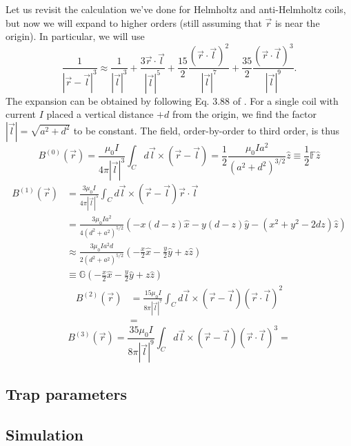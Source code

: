 \documentclass{article}
\theoremstyle{definition}
\newcommand{\f}[2]{\frac{#1}{#2}}
\begin{document}
Let us revisit the calculation we've done for Helmholtz and anti-Helmholtz coils, but now we will expand to higher orders (still assuming that $\vec{r}$ is near the origin). In particular, we will use
\begin{equation*}
\f{1}{|\vec{r} - \vec{l}|^3} \approx \f{1}{|\vec{l}|^3} + \f{3 \vec{r}\cdot \vec{l}}{|\vec{l}|^5} + \f{15}{2}\f{(\vec{r}\cdot\vec{l})^2}{|\vec{l}|^7} + \f{35}{2} \f{(\vec{r}\cdot \vec{l})^3}{|\vec{l}|^9}.
\end{equation*}
The expansion can be obtained by following 
Eq. 3.88 of \cite{griffiths2005introduction}. For a single coil with current $I$ placed a vertical distance $+d$ from the origin, we find the factor $|\vec{l}| = \sqrt{a^2 + d^2}$ to be constant. The field, order-by-order to third order, is thus  
\begin{equation*}
B^{(0)}(\vec{r}) = \f{\mu_0 I}{4\pi |\vec{l}|^3}\int_C d\vec{l}\times (\vec{r} - \vec{l}) = \f{1}{2}\f{\mu_0 I a^2}{(a^2 + d^2)^{3/2}} \hat{z} \equiv \f{1}{2}\mathbb{F}\hat{z}
\end{equation*}
\begin{align*}
B^{(1)}(\vec{r}) &= \f{3\mu_0 I}{4\pi |\vec{l}|^5}\int_C d\vec{l}\times (\vec{r} - \vec{l}) \vec{r}\cdot \vec{l}\\
&=\f{3\mu_0 Ia^2}{4(d^2+a^2)^{5/2}} \left(- x(d-z)\hat{x}  - y (d-z)\hat{y} -  (x^2 + y^2 - 2dz)\hat{z}\right)\\
&\approx \f{3\mu_0 Ia^2 d}{2(d^2+a^2)^{5/2}} \left(-\f{x}{2}\hat{x}  - \f{y}{2}\hat{y} + z\hat{z}\right)\\
&\equiv \mathbb{G}\left(-\f{x}{2}\hat{x}  - \f{y}{2}\hat{y} + z\hat{z}\right)
\end{align*}
\begin{align*}
B^{(2)}(\vec{r}) 
&= \f{15\mu_0 I}{8\pi |\vec{l}|^7}\int_C d\vec{l}\times (\vec{r} - \vec{l}) (\vec{r}\cdot \vec{l})^2\\
&= 
\end{align*}
\begin{equation*}
B^{(3)}(\vec{r}) = \f{35\mu_0 I}{8\pi |\vec{l}|^9}\int_C d\vec{l}\times (\vec{r} - \vec{l}) (\vec{r}\cdot \vec{l})^3 = 
\end{equation*}

\subsection{Trap parameters}

\subsection{Simulation}
\end{document}
